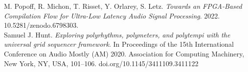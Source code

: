 \documentclass[journal,onecolumn]{IEEEtran}
\begin{document}
\begin{thebibliography}{1}
M. Popoff, R. Michon, T. Risset, Y. Orlarey, S. Letz. \emph{Towards an FPGA-Based Compilation Flow for Ultra-Low Latency Audio Signal Processing}. 2022. 10.5281/zenodo.6798303. \\

Samuel J. Hunt. \emph{Exploring polyrhythms, polymeters, and polytempi with the universal grid sequencer framework}. In Proceedings of the 15th International Conference on Audio Mostly (AM) 2020. Association for Computing Machinery, New York, NY, USA, 101–106. doi.org/10.1145/3411109.3411122 \\

\end{thebibliography}

% 










\end{document}
